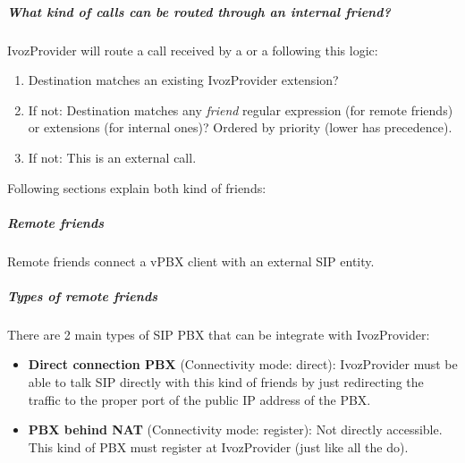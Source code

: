 \documentclass[letterpaper,10pt,spanish]{sphinxmanual}
\begin{document}
\subparagraph{What kind of calls can be routed through an \emph{internal friend}?}
\label{administration_portal/client/vpbx/routing_endpoints/friends/index:what-kind-of-calls-can-be-routed-through-an-internal-friend}
IvozProvider will route a call received by a {\hyperref[administration_portal/client/vpbx/users:users]{}} or a {\hyperref[administration_portal/client/vpbx/routing_endpoints/friends/index:friends]{}} following this logic:
\begin{enumerate}
\item {} 
Destination matches an existing IvozProvider extension?

\item {} 
If not: Destination matches any \emph{friend} regular expression (for remote friends) or extensions (for internal ones)? Ordered by priority (lower has precedence).

\item {} 
If not: This is an external call.

\end{enumerate}

Following sections explain both kind of friends:


\subparagraph{Remote friends}
\label{administration_portal/client/vpbx/routing_endpoints/friends/remote_friends:remote-friends}\label{administration_portal/client/vpbx/routing_endpoints/friends/remote_friends::doc}
Remote friends connect a vPBX client with an external SIP entity.


\subparagraph{Types of remote friends}
\label{administration_portal/client/vpbx/routing_endpoints/friends/remote_friends:types-of-remote-friends}
There are 2 main types of SIP PBX that can be integrate with IvozProvider:
\begin{itemize}
\item {} 
\textbf{Direct connection PBX} (Connectivity mode: direct): IvozProvider must be able to talk SIP directly with
this kind of friends by just redirecting the traffic to the proper port of
the public IP address of the PBX.

\item {} 
\textbf{PBX behind NAT} (Connectivity mode: register): Not directly accessible. This kind of PBX must register at
IvozProvider (just like all the {\hyperref[administration_portal/client/vpbx/terminals:terminals]{}} do).

\end{itemize}
\end{document}
